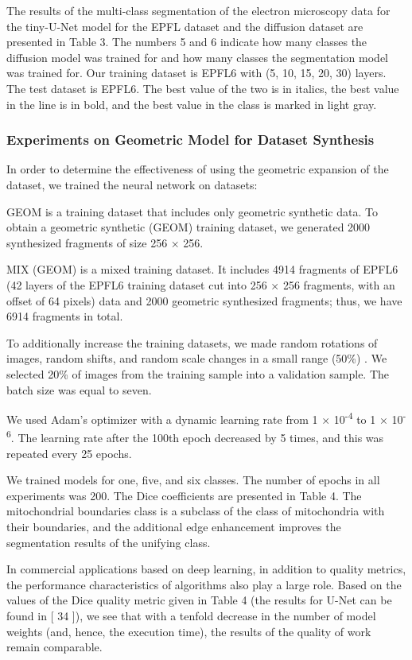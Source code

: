 \documentclass[journal,article,submit,pdftex,moreauthors]{Definitions/mdpi}
\begin{document}
The results of the multi-class segmentation of the electron microscopy data for the tiny-U-Net model for the EPFL dataset and the diffusion dataset are presented in Table 3. The numbers 5 and 6 indicate how many classes the diffusion model was trained for and how many classes the segmentation model was trained for. Our training dataset is EPFL6 with (5, 10, 15, 20, 30) layers. The test dataset is EPFL6. The best value of the two is in italics, the best value in the line is in bold, and the best value in the class is marked in light gray.

\subsubsection{Experiments on Geometric Model for Dataset Synthesis}

In order to determine the effectiveness of using the geometric expansion of the dataset, we trained the neural network on datasets:

GEOM is a training dataset that includes only geometric synthetic data. To obtain a geometric synthetic (GEOM) training dataset, we generated 2000 synthesized fragments of size 256 × 256.

MIX (GEOM) is a mixed training dataset. It includes 4914 fragments of EPFL6 (42 layers of the EPFL6 training dataset cut into 256 × 256 fragments, with an offset of 64 pixels) data and 2000 geometric synthesized fragments; thus, we have 6914 fragments in total.

To additionally increase the training datasets, we made random rotations of images, random shifts, and random scale changes in a small range (50\%) . We selected 20\% of images from the training sample into a validation sample. The batch size was equal to seven.

We used Adam’s optimizer with a dynamic learning rate from 1 × 10\textsuperscript{-4} to 1 × 10\textsuperscript{-6}. The learning rate after the 100th epoch decreased by 5 times, and this was repeated every 25 epochs.

We trained models for one, five, and six classes. The number of epochs in all experiments was 200. The Dice coefficients are presented in Table 4. The mitochondrial boundaries class is a subclass of the class of mitochondria with their boundaries, and the additional edge enhancement improves the segmentation results of the unifying class.

In commercial applications based on deep learning, in addition to quality metrics, the performance characteristics of algorithms also play a large role. Based on the values of the Dice quality metric given in Table 4 (the results for U-Net can be found in [ 34 ]), we see that with a tenfold decrease in the number of model weights (and, hence, the execution time), the results of the quality of work remain comparable.
\end{document}
